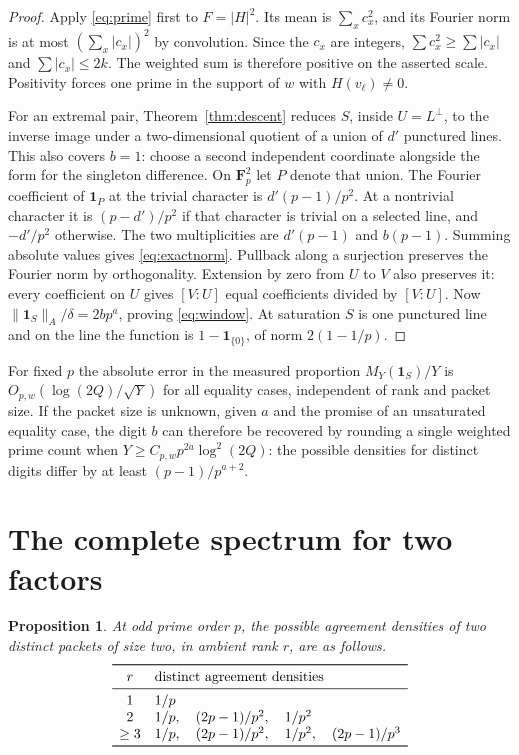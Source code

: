 \documentclass[11pt,letterpaper]{article}
\newcommand{\Fp}{\mathbf F_p}
\newtheorem{proposition}[theorem]{Proposition}
\theoremstyle{remark}
\begin{document}
\begin{proof}
Apply \eqref{eq:prime} first to $F=|H|^2$.
Its mean is $\sum_x c_x^2$, and its Fourier norm is at most
$(\sum_x|c_x|)^2$ by convolution. Since the $c_x$ are integers,
$\sum c_x^2\ge\sum |c_x|$ and $\sum |c_x|\le2k$.
The weighted sum is therefore positive on the asserted scale.
Positivity forces one prime in the support of $w$ with $H(v_\ell)\ne0$.

For an extremal pair, Theorem~\ref{thm:descent} reduces $S$, inside
$U=L^\perp$, to the inverse image under a two-dimensional quotient
of a union of $d'$ punctured lines. This also covers $b=1$:
choose a second independent coordinate alongside the form for the
singleton difference. On $\Fp^2$ let $P$ denote that union.
The Fourier coefficient of $\mathbf1_P$ at the trivial character is
$d'(p-1)/p^2$. At a nontrivial character it is $(p-d')/p^2$ if that
character is trivial on a selected line, and $-d'/p^2$ otherwise.
The two multiplicities are $d'(p-1)$ and $b(p-1)$. Summing absolute
values gives \eqref{eq:exactnorm}. Pullback along a surjection preserves
the Fourier norm by orthogonality. Extension by zero from $U$ to $V$
also preserves it: every coefficient on $U$ gives $[V:U]$ equal
coefficients divided by $[V:U]$. Now
$\|\mathbf1_S\|_A/\delta=2bp^a$, proving \eqref{eq:window}.
At saturation $S$ is one punctured line and on the line the function
is $1-\mathbf1_{\{0\}}$, of norm $2(1-1/p)$.
\end{proof}

For fixed $p$ the absolute error in the measured proportion
$M_Y(\mathbf1_S)/Y$ is $O_{p,w}(\log(2Q)/\sqrt Y)$ for all equality
cases, independent of rank and packet size. If the packet size is unknown, given $a$ and the promise
of an unsaturated equality case, the digit $b$ can therefore be
recovered by rounding a single weighted prime count when
$Y\ge C_{p,w}p^{2a}\log^2(2Q)$: the possible densities for distinct
digits differ by at least $(p-1)/p^{a+2}$.
\section{The complete spectrum for two factors}

\begin{proposition}\label{prop:two}
At odd prime order $p$, the possible \emph{agreement} densities of two
distinct packets of size two, in ambient rank $r$, are as follows.
\[
\begin{array}{cl}
\toprule
 r & \text{distinct agreement densities} \\
\midrule
 1 & 1/p \\
 2 & 1/p,\quad (2p-1)/p^2,\quad 1/p^2 \\
 \ge3 & 1/p,\quad (2p-1)/p^2,\quad 1/p^2,\quad (2p-1)/p^3 \\
\bottomrule
\end{array}
\]
\end{proposition}
\end{document}
